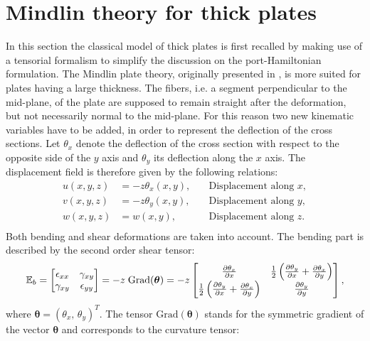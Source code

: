 \documentclass[11t]{article}
\begin{document}
	\section{Mindlin theory for thick plates}
	\label{sec:Min_Var}
	{In this section the classical model of thick plates is first recalled by making use of a tensorial formalism to simplify the discussion on the port-Hamiltonian formulation.} The Mindlin plate theory, originally presented in \cite{mindlin}, is more suited for plates having a large thickness. The fibers, i.e. a segment perpendicular to the mid-plane, of the plate are supposed to remain straight after the deformation, but not necessarily normal to the mid-plane. For this reason two new kinematic variables have to be added, in order to represent the deflection of the cross sections. { Let $\theta_x$ denote the deflection of the cross section with respect to the opposite side of the $y$ axis and  $\theta_y$ its deflection along the $x$ axis. The displacement field is therefore given by the following relations:
		\begin{equation}
		\begin{aligned}
		u(x,y,z) &= -z \theta_x(x,y), \quad &\text{Displacement along $x$}, \\
		v(x,y,z) &= -z \theta_y(x,y), \quad &\text{Displacement along $y$}, \\
		w(x,y,z) &= w(x,y),  \quad &\text{Displacement along $z$}. \\
		\end{aligned}
		\end{equation}
		Both bending and shear deformations are taken into account. The bending part is described by the second order shear tensor:
		\begin{equation}
		\mathbb{E}_b = 
		\begin{bmatrix}
		\epsilon_{xx} & \gamma_{xy} \\
		\gamma_{xy} & \epsilon_{yy} \\
		\end{bmatrix} = -z \; \mathrm{Grad}(\bm\theta) = -z
		\begin{bmatrix}
		\diffp{\theta_x}{x} & \frac{1}{2} \left( \diffp{\theta_y}{x} + \diffp{\theta_x}{y} \right)\\
		\frac{1}{2} \left( \diffp{\theta_y}{x} + \diffp{\theta_x}{y} \right) & \diffp{\theta_y}{y} \\
		\end{bmatrix},
		\end{equation}
		where $\bm{\theta} = (\theta_x, \, \theta_y)^T$. The tensor $\mathrm{Grad}(\bm{\theta})$ stands for the symmetric gradient of the vector $\bm{\theta}$ and corresponds to the curvature tensor:
}
\end{document}
